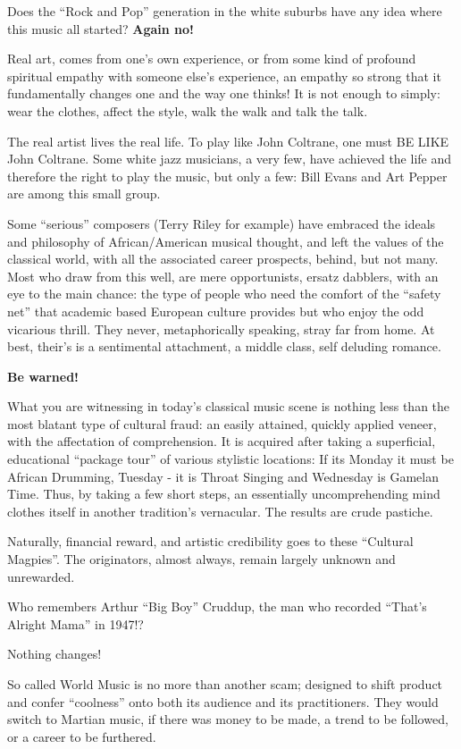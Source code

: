 \documentclass{article}
\begin{document}
Does the ``Rock and Pop'' generation in the white suburbs have any idea where this music all started?
\textbf{Again no!}

Real art, comes from one's own experience, or from some kind of profound spiritual empathy with someone else's experience, an empathy so strong that it fundamentally changes one and the way one thinks!
It is not enough to simply: wear the clothes, affect the style, walk the walk and talk the talk.

The real artist lives the real life.
To play like John Coltrane, one must BE LIKE John Coltrane.
Some white jazz musicians, a very few, have achieved the life and therefore the right to play the music, but only a few: Bill Evans and Art Pepper are among this small group.

Some ``serious'' composers (Terry Riley for example) have embraced the ideals and philosophy of African/American musical thought, and left the values of the classical world, with all the associated career prospects, behind, but not many.
Most who draw from this well, are mere opportunists, ersatz dabblers, with an eye to the main chance: the type of people who need the comfort of the ``safety net'' that academic based European culture provides but who enjoy the odd vicarious thrill.
They never, metaphorically speaking, stray far from home.
At best, their's is a sentimental attachment, a middle class, self deluding romance.

\textbf{Be warned!}

What you are witnessing in today's classical music scene is nothing less than the most blatant type of cultural fraud: an easily attained, quickly applied veneer, with the affectation of comprehension.
It is acquired after taking a superficial, educational ``package tour'' of various stylistic locations: If its Monday it must be African Drumming, Tuesday - it is Throat Singing and Wednesday is Gamelan Time.
Thus, by taking a few short steps, an essentially uncomprehending mind clothes itself in another tradition's vernacular.
The results are crude pastiche.

Naturally, financial reward, and artistic credibility goes to these ``Cultural Magpies''.
The originators, almost always, remain largely unknown and unrewarded.

Who remembers Arthur ``Big Boy'' Cruddup, the man who recorded ``That's Alright Mama'' in 1947!?

Nothing changes!

So called World Music is no more than another scam; designed to shift product and confer ``coolness'' onto both its audience and its practitioners.
They would switch to Martian music, if there was money to be made, a trend to be followed, or a career to be furthered.
\end{document}
